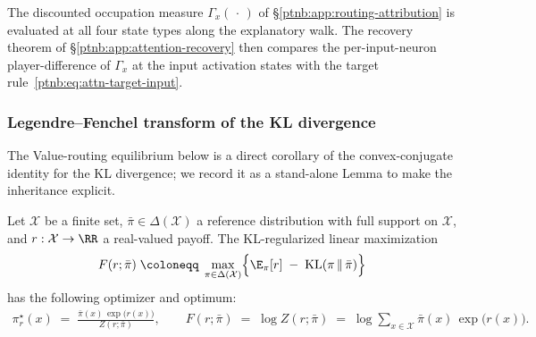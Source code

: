 The discounted occupation measure $\Gamma_x(\,\cdot\,)$ of \S\ref{ptnb:app:routing-attribution} is
evaluated at all four state types along the explanatory walk. The recovery theorem of
\S\ref{ptnb:app:attention-recovery} then compares the per-input-neuron player-difference of $\Gamma_x$
at the input activation states with the target rule~\eqref{ptnb:eq:attn-target-input}.

\subsubsection{Legendre--Fenchel transform of the KL divergence}\label{ptnb:app:kl-legendre-fenchel}

The Value-routing equilibrium below is a direct corollary of the convex-conjugate identity for the
KL divergence; we record it as a stand-alone Lemma to make the inheritance explicit.

\begin{lemmaenv}\label{ptnb:lem:kl-legendre-fenchel}
Let $\mathcal{X}$ be a finite set, $\bar\pi \in \Delta(\mathcal{X})$ a reference distribution with
full support on $\mathcal{X}$, and $r : \mathcal{X} \to \RR$ a real-valued payoff. The
KL-regularized linear maximization
\begin{align}\label{ptnb:eq:kl-lf-objective}
    F(r;\bar\pi) \;\coloneqq\; \max_{\pi \in \Delta(\mathcal{X})}
    \Bigl\{ \E_\pi[r] \;-\; \mathrm{KL}(\pi \,\|\, \bar\pi) \Bigr\}
\end{align}
has the following optimizer and optimum:
\begin{align}\label{ptnb:eq:kl-lf-optimizer}
    \pi_r^\star(x) \;=\; \frac{\bar\pi(x)\,\exp\!\bigl(r(x)\bigr)}{Z(r;\bar\pi)},
    \qquad
    F(r;\bar\pi) \;=\; \log Z(r;\bar\pi) \;=\; \log\!\sum_{x \in \mathcal{X}}
    \bar\pi(x)\,\exp\!\bigl(r(x)\bigr).
\end{align}
\hfill{}
\end{lemmaenv}

